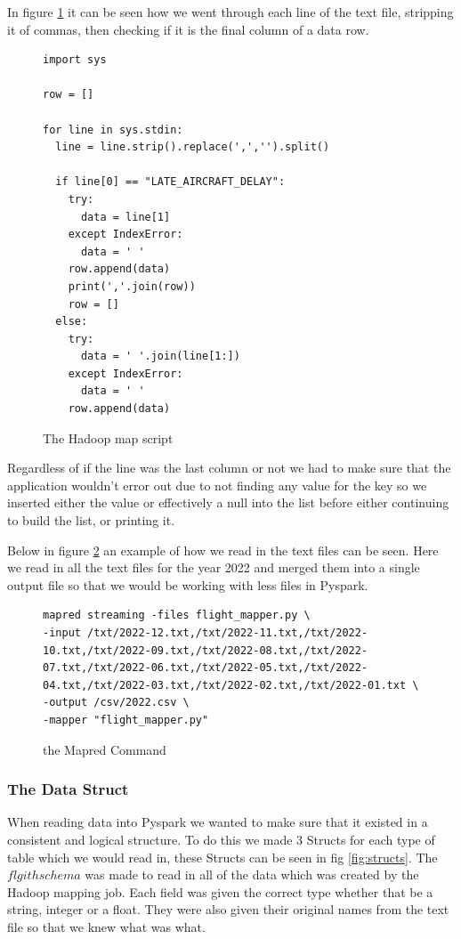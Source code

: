 In figure \ref{fig:mapper} it can be seen how we went through each line of the text file, stripping it of commas, then checking if it is the final column of a data row. 
 
\begin{figure}[H]
\centering
\begin{lstlisting}
import sys

row = []

for line in sys.stdin:
  line = line.strip().replace(',','').split()

  if line[0] == "LATE_AIRCRAFT_DELAY":
    try:
      data = line[1]
    except IndexError:
      data = ' '
    row.append(data)
    print(','.join(row))
    row = []
  else:
    try:
      data = ' '.join(line[1:])
    except IndexError:
      data = ' '
    row.append(data)
\end{lstlisting}
\caption{The Hadoop map script}
\label{fig:mapper}
\end{figure}

Regardless of if the line was the last column or not we had to make sure that the application wouldn't error out due to not finding any value for the key so we inserted either the value or effectively a null into the list before either continuing to build the list, or printing it.

Below in figure \ref{fig:mapper_command} an example of how we read in the text files can be seen. Here we read in all the text files for the year 2022 and merged them into a single output file so that we would be working with less files in Pyspark.

\begin{figure}[H]
\centering
\begin{lstlisting}
mapred streaming -files flight_mapper.py \
-input /txt/2022-12.txt,/txt/2022-11.txt,/txt/2022-10.txt,/txt/2022-09.txt,/txt/2022-08.txt,/txt/2022-07.txt,/txt/2022-06.txt,/txt/2022-05.txt,/txt/2022-04.txt,/txt/2022-03.txt,/txt/2022-02.txt,/txt/2022-01.txt \
-output /csv/2022.csv \
-mapper "flight_mapper.py"
\end{lstlisting}
\caption{the Mapred Command}
\label{fig:mapper_command}
\end{figure}

\subsubsection{The Data Struct}
When reading data into Pyspark we wanted to make sure that it existed in a consistent and logical structure. To do this we made 3 Structs for each type of table which we would read in, these Structs can be seen in fig \ref{fig:structs}. The $flgithschema$ was made to read in all of the data which was created by the Hadoop mapping job. Each field was given the correct type whether that be a string, integer or a float. They were also given their original names from the text file so that we knew what was what.

